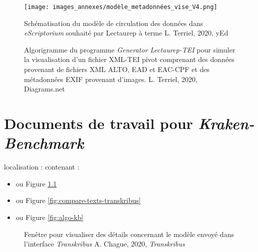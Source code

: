 
\begin{figure}
  \begin{sideways}
    \texttt{[image: images\_annexes/modèle\_metadonnées\_vise\_V4.png]}
  \end{sideways}
  \centering
  \caption{Schématisation du modèle de circulation des données dans \textit{eScriptorium} souhaité par Lectaurep à terme  \textcopyright L. Terriel, 2020, yEd}
  \label{fig:modele_vise_V4}
\end{figure}

\begin{figure}
    \centering
    \centerline{}
    \caption{Algorigramme du programme \textit{Generator Lectaurep-TEI} pour simuler la visualisation d'un fichier XML-TEI pivot comprenant des données provenant de fichiers XML ALTO, EAD et EAC-CPF et des métadonnées EXIF provenant d'images.   \textcopyright L. Terriel, 2020, Diagrams.net}
    \label{fig:generateur_tei}
\end{figure}

\chapter{Documents de travail pour \textit{\textit{Kraken-Benchmark}}}\label{doc_ax_kb}
localisation :  contenant :

\begin{itemize}
    \item {} ou Figure \ref{fig:details-model-transkribus}
    \item {} ou Figure \ref{fig:compare-texts-transkribus}
    \item {} ou Figure \ref{fig:algo-kb}
\end{itemize}

\begin{figure}
    \centering
    \centerline{}
    \caption{Fenêtre pour visualiser des détails concernant le modèle envoyé dans l'interface \textit{Transkribus} \textcopyright A. Chague, 2020, \textit{Transkribus}}
    \label{fig:details-model-transkribus}
\end{figure}

